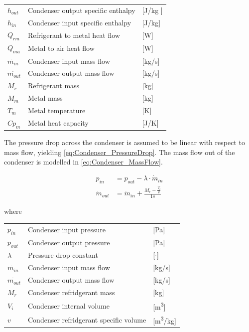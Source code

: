 \begin{center}
	\begin{tabular}{l p{8cm} l}
		$h_{out}$       & Condenser output specific enthalpy & [\si{J}/\si{kg} ] \\
		$h_{in}$        & Condenser input specific enthalpy  & [\si{J}/\si{kg}]  \\
		$Q_{rm}$        & Refrigerant to metal heat flow     & [\si{W}]          \\
		$Q_{ma}$        & Metal to air heat flow             & [\si{W}]          \\
		$\dot{m_{in}}$  & Condenser input mass flow          & [\si{kg}/\si{s}]  \\
		$\dot{m_{out}}$ & Condenser output mass flow         & [\si{kg}/\si{s}]  \\
		$M_r$           & Refrigerant mass                   & [\si{kg}]         \\
		$M_m$           & Metal mass                         & [\si{kg}]         \\
		$T_m$           & Metal temperature                  & [\si{K}]          \\
		$Cp_m$          & Metal heat capacity                & [\si{J}/\si{K}]
	\end{tabular}
\end{center}

The pressure drop across the condenser is assumed to be linear with respect to mass flow, yielding \cref{eq:Condenser_PressureDrop}.
The mass flow out of the condenser is modelled in \cref{eq:Condenser_MassFlow}.


\begin{align}
	p_{in} 	& =  p_{out} - \lambda \cdot \dot{m}_{in}  				\label{eq:Condenser_PressureDrop}\\
	\dot{m}_{out}		& = \dot{m}_{in} + \frac{M_r - \frac{V_i}{v}}{1s}		\label{eq:Condenser_MassFlow}
\end{align}

where

\begin{center}
	\begin{tabular}{l p{8cm} l}
		$p_{in}$				&	Condenser input pressure					& [\si{Pa}] \\
		$p_{out}$				&	Condenser output pressure					& [\si{Pa}] \\
		$\lambda$				& 	Pressure drop constant	 					& [$\cdot$] \\
		$\dot{m_{in}}$			& 	Condenser input mass flow 					& [\si{kg}/\si{s}] \\
		$\dot{m_{out}}$			& 	Condenser output mass flow 					& [\si{kg}/\si{s}] \\
		$M_{r}$					&	Condenser refridgerant mass					& [\si{kg}] \\
		$V_{i}$					&	Condenser internal volume					& [\si{m^3}] \\
		$v$						&	Condenser refridgerant specific volume		& [\si{m^3}/\si{kg}] \\
	\end{tabular}
\end{center}


